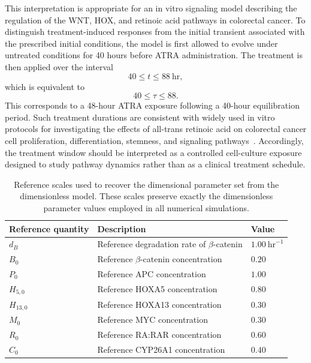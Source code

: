 \documentclass[11pt]{article}
\begin{document}
This interpretation is appropriate for an in vitro signaling model describing the
regulation of the WNT, HOX, and retinoic acid pathways in colorectal cancer.
To distinguish treatment-induced responses from the initial transient associated
with the prescribed initial conditions, the model is first allowed to evolve under
untreated conditions for 40 hours before ATRA administration. The treatment is
then applied over the interval
\[
40 \leq t \leq 88~\mathrm{hr},
\]
which is equivalent to
\[
40 \leq \tau \leq 88.
\]
This corresponds to a 48-hour ATRA exposure following a 40-hour equilibration
period. Such treatment durations are consistent with widely used in vitro protocols
for investigating the effects of all-trans retinoic acid on colorectal cancer cell
proliferation, differentiation, stemness, and signaling
pathways~\cite{ordonezmoran2015hoxa5,facey2020retinoids,xu2022atra}. Accordingly, the treatment
window should be interpreted as a controlled cell-culture exposure designed to
study pathway dynamics rather than as a clinical treatment schedule.
\begin{table}[ht]
\centering
\caption{Reference scales used to recover the dimensional parameter set from the
dimensionless model. These scales preserve exactly the dimensionless parameter
values employed in all numerical simulations.}
\label{tab:reference_scales}
\begin{tabular}{lll}
\toprule
Reference quantity & Description & Value \\
\midrule
$d_B$ & Reference degradation rate of $\beta$-catenin & $1.00~\mathrm{hr}^{-1}$\\
$B_0$ & Reference $\beta$-catenin concentration & $0.20$\\
$P_0$ & Reference APC concentration & $1.00$\\
$H_{5,0}$ & Reference HOXA5 concentration & $0.80$\\
$H_{13,0}$ & Reference HOXA13 concentration & $0.30$\\
$M_0$ & Reference MYC concentration & $0.30$\\
$R_0$ & Reference RA:RAR concentration & $0.60$\\
$C_0$ & Reference CYP26A1 concentration & $0.40$\\
\bottomrule
\end{tabular}
\end{table}
\end{document}
